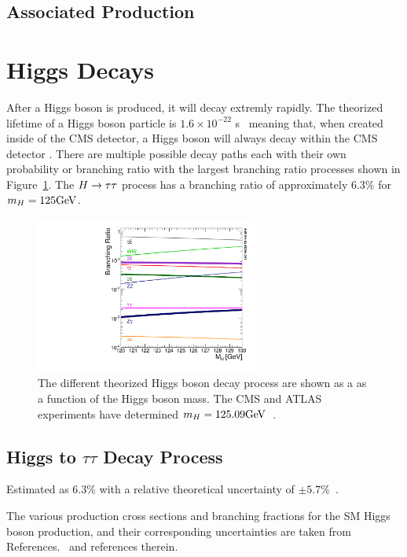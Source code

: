\subsection{Associated Production}

\section{Higgs Decays}

After a Higgs boson is produced, it will decay extremly rapidly. The theorized lifetime of a Higgs
boson particle is $1.6 \times 10^{-22}$ s~\cite{Dittmaier:2012vm} meaning that, when created
inside of the CMS detector, a Higgs boson will always decay
within the CMS detector . There are multiple possible decay
paths each with their own probability or branching ratio with the largest branching ratio
processes shown in Figure~\ref{fig:higgs_decay}. The $H\to\tau\tau$ process has a branching
ratio of approximately 6.3\% for $m_{H} = 125\mathrm{GeV}$.


\begin{figure}[htbp]
\centering
     \includegraphics[width=0.65\textwidth]{phenomology_of_processes/plots/SMHiggsBR_YR4-square.pdf}
     \caption{
The different theorized Higgs boson decay process are shown as a 
as a function of the Higgs boson mass.
The CMS and ATLAS experiments have determined $m_{H} = 125.09\mathrm{GeV}$~\cite{Aad:2015zhl}.
     }
     \label{fig:higgs_decay}
\end{figure}


\subsection{Higgs to $\tau\tau$ Decay Process}

Estimated as 6.3\% with a relative theoretical uncertainty of $\pm5.7\%$~\cite{deFlorian:2016spz}.




The various production cross sections and branching fractions for the SM Higgs 
boson production, and their corresponding uncertainties are taken from 
References.~\cite{deFlorian:2016spz,Denner:2011mq,Ball:2011mu} and references therein.














